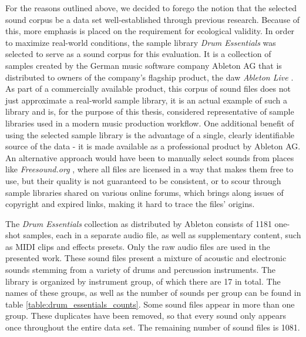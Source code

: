 \smallskip

For the reasons outlined above, we decided to forego the notion that
the selected sound corpus be a data set well-established through previous
research. Because of this, more emphasis is placed on the requirement for
ecological validity. In order to maximize real-world conditions, the sample
library \textit{Drum Essentials} \citep{drumessentials2019} was selected to
serve as a sound corpus for this evaluation. It is a collection of samples
created by the German music software company Ableton AG that is distributed to
owners of the company's flagship product, the \gls{daw} \textit{Ableton Live}
\citep{abletonlive2019}. As part of a commercially available product, this
corpus of sound files does not just approximate a real-world sample library, it
is an actual example of such a library and is, for the purpose of this thesis,
considered representative of sample libraries used in a modern music production
workflow. One additional benefit of using the selected sample library is the
advantage of a single, clearly identifiable source of the data - it is made
available as a professional product by Ableton AG. An alternative approach would
have been to manually select sounds from places like \textit{Freesound.org}
\citep{font2013}, where all files are licensed in a way that makes them free to
use, but their quality is not guaranteed to be consistent, or to scour through
sample libraries shared on various online forums, which brings along issues of
copyright and expired links, making it hard to trace the files' origins.

\smallskip

The \textit{Drum Essentials} collection as distributed by Ableton consists of
1181 one-shot samples, each in a separate audio file, as well as supplementary
content, such as MIDI clips and effects presets. Only the raw audio files are
used in the presented work. These sound files present a mixture of acoustic
and electronic sounds stemming from a variety of drums and percussion
instruments. The library is organized by instrument group, of which there are
17 in total. The names of these groups, as well as the number of sounds per
group can be found in table \ref{table:drum_essentials_counts}. Some sound files
appear in more than one group. These duplicates have been removed, so that every
sound only appears once throughout the entire data set. The remaining number of
sound files is 1081.

\renewcommand{\arraystretch}{1.2}

